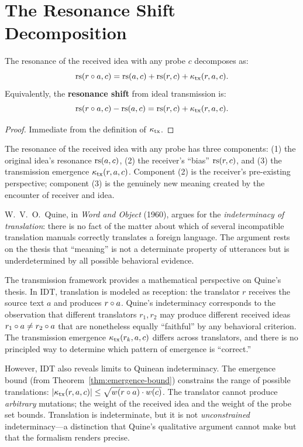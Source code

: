 \section{The Resonance Shift Decomposition}

\begin{theorem}\label{thm:resonance-shift}
The resonance of the received idea with any probe $c$ decomposes as:
\[
    \mathrm{rs}(r \circ a, c) = \mathrm{rs}(a, c) + \mathrm{rs}(r, c)
    + \kappa_{\mathrm{tx}}(r, a, c).
\]
Equivalently, the \textbf{resonance shift} from ideal transmission is:
\[
    \mathrm{rs}(r \circ a, c) - \mathrm{rs}(a, c) = \mathrm{rs}(r, c)
    + \kappa_{\mathrm{tx}}(r, a, c).
\]
\end{theorem}
\begin{proof}
Immediate from the definition of $\kappa_{\mathrm{tx}}$.
\end{proof}

\begin{interpretation}
The resonance of the received idea with any probe has three components:
(1) the original idea's resonance $\mathrm{rs}(a,c)$, (2) the receiver's
``bias'' $\mathrm{rs}(r,c)$, and (3) the transmission emergence
$\kappa_{\mathrm{tx}}(r,a,c)$. Component (2) is the receiver's
pre-existing perspective; component (3) is the genuinely new meaning
created by the encounter of receiver and idea.
\end{interpretation}

\begin{interpretation}\label{interp:ch7:quine_indeterminacy}
W.~V.~O.~Quine, in \emph{Word and Object} (1960), argues for the
\emph{indeterminacy of translation}: there is no fact of the matter about
which of several incompatible translation manuals correctly translates a
foreign language. The argument rests on the thesis that ``meaning'' is not
a determinate property of utterances but is underdetermined by all
possible behavioral evidence.

The transmission framework provides a mathematical perspective on Quine's
thesis. In IDT, translation is modeled as reception: the translator $r$
receives the source text $a$ and produces $r \circ a$. Quine's
indeterminacy corresponds to the observation that different translators
$r_1, r_2$ may produce different received ideas $r_1 \circ a \neq
r_2 \circ a$ that are nonetheless equally ``faithful'' by any
behavioral criterion. The transmission emergence $\kappa_{\text{tx}}(r_k,
a, c)$ differs across translators, and there is no principled way to
determine which pattern of emergence is ``correct.''

However, IDT also reveals limits to Quinean indeterminacy. The emergence
bound (from Theorem~\ref{thm:emergence-bound}) constrains the range of
possible translations: $|\kappa_{\text{tx}}(r, a, c)| \leq \sqrt{w(r
\circ a) \cdot w(c)}$. The translator cannot produce \emph{arbitrary}
mutations; the weight of the received idea and the weight of the probe
set bounds. Translation is indeterminate, but it is not
\emph{unconstrained} indeterminacy---a distinction that Quine's
qualitative argument cannot make but that the formalism renders precise.
\end{interpretation}

